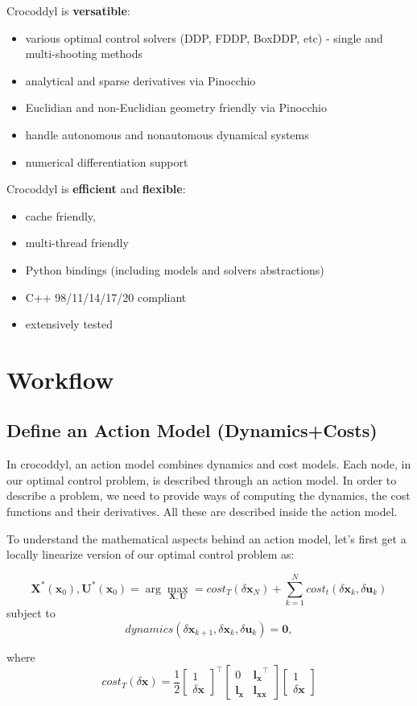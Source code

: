 Crocoddyl is \textbf{versatible}:
\begin{itemize}
\item various optimal control solvers (DDP, FDDP, BoxDDP, etc) - single and multi-shooting methods
\item analytical and sparse derivatives via Pinocchio
\item Euclidian and non-Euclidian geometry friendly via Pinocchio
\item handle autonomous and nonautomous dynamical systems
\item numerical differentiation support
\end{itemize}

Crocoddyl is \textbf{efficient} and \textbf{flexible}:
\begin{itemize}
\item cache friendly,
\item multi-thread friendly
\item Python bindings (including models and solvers abstractions)
\item C++ 98/11/14/17/20 compliant
\item extensively tested
\end{itemize}

\section{Workflow}

\subsection{Define an Action Model (Dynamics+Costs)}
In crocoddyl, an action model combines dynamics and cost models. Each node, in our optimal control problem, is described through an action model. In order to describe a problem, we need to provide ways of computing the dynamics, the cost functions and their derivatives. All these are described inside the action model.

To understand the mathematical aspects behind an action model, let's first get a locally linearize version of our optimal control problem as:

$$\mathbf{X}^*(\mathbf{x}_0),\mathbf{U}^*(\mathbf{x}_0)
=
\arg\max_{\mathbf{X},\mathbf{U}} = cost_T(\delta\mathbf{x}_N) + \sum_{k=1}^N cost_t(\delta\mathbf{x}_k, \delta\mathbf{u}_k)$$
subject to
$$dynamics(\delta\mathbf{x}_{k+1},\delta\mathbf{x}_k,\delta\mathbf{u}_k)=\mathbf{0},$$

where
$$cost_T(\delta\mathbf{x}) = \frac{1}{2}
\begin{bmatrix} 
  1 \\ \delta\mathbf{x}
\end{bmatrix}^\top
\begin{bmatrix}
0 & \mathbf{l_x}^\top \\
\mathbf{l_x} & \mathbf{l_{xx}}
\end{bmatrix}
\begin{bmatrix}
  1 \\ \delta\mathbf{x}
\end{bmatrix}
$$

